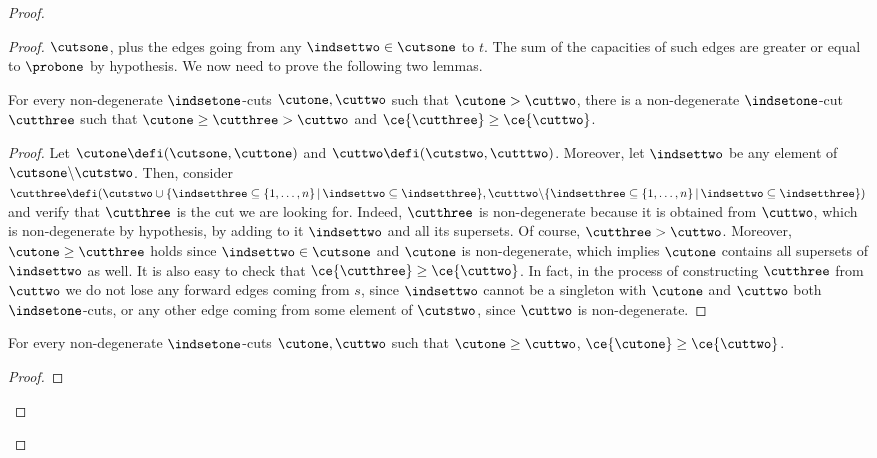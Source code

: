 \begin{proof}
\begin{varitemize}
\begin{proof}
      $\cutsone$, plus the edges going from any $\indsettwo\in\cutsone$ to
      $t$. The sum of the capacities of such edges are greater or equal to
      $\probone$ by hypothesis.
      We now need to prove the following two lemmas.
      \begin{varitemize}
      \item
        \begin{lemma}\label{l:helper1}
          For every non-degenerate $\indsetone$-cuts $\cutone,\cuttwo$ such
          that $\cutone>\cuttwo$, there is a non-degenerate $\indsetone$-cut
          $\cutthree$ such that $\cutone\geq\cutthree>\cuttwo$ and
          $\ce{\cutthree}\geq\ce{\cuttwo}$.
        \end{lemma}
        \begin{proof}
          Let $\cutone\defi(\cutsone,\cuttone)$ and
          $\cuttwo\defi(\cutstwo,\cutttwo)$. Moreover, let $\indsettwo$ be any
          element of $\cutsone\mathord{\setminus}\cutstwo$. Then, consider
          $\cutthree\defi(\cutstwo\cup\{\indsetthree\subseteq\{1,\dots,n\}\,|\,
          \indsettwo\subseteq\indsetthree\},\cutttwo\mathord{\setminus}\{\indsetthree\subseteq\{1,\dots,n\}\,|\,\indsettwo\subseteq\indsetthree\})$
          and verify that $\cutthree$ is the cut we are looking for. Indeed,
          $\cutthree$ is non-degenerate because it is obtained from $\cuttwo$,
          which is non-degenerate by hypothesis, by adding to it $\indsettwo$
          and all its supersets. Of course, $\cutthree>\cuttwo$. Moreover,
          $\cutone\geq\cutthree$ holds since $\indsettwo\in\cutsone$ and
          $\cutone$ is non-degenerate, which implies $\cutone$ contains all
          supersets of $\indsettwo$ as well. It is also easy to check that
          $\ce{\cutthree}\geq\ce{\cuttwo}$. In fact, in the process of
          constructing $\cutthree$ from $\cuttwo$ we do not lose any forward
          edges coming from $s$, since $\indsettwo$ cannot be a singleton with
          $\cutone$ and $\cuttwo$ both $\indsetone$-cuts, or any other edge
          coming from some element of $\cutstwo$, since $\cuttwo$ is
          non-degenerate.
        \end{proof}
      \item
        \begin{lemma}\label{l:helper2}
          For every non-degenerate $\indsetone$-cuts $\cutone,\cuttwo$ such
          that $\cutone\geq\cuttwo$, $\ce{\cutone}\geq\ce{\cuttwo}$.
        \end{lemma}
        \begin{proof}

\end{proof}
\end{varitemize}
\end{proof}
\end{varitemize}
\end{proof}
